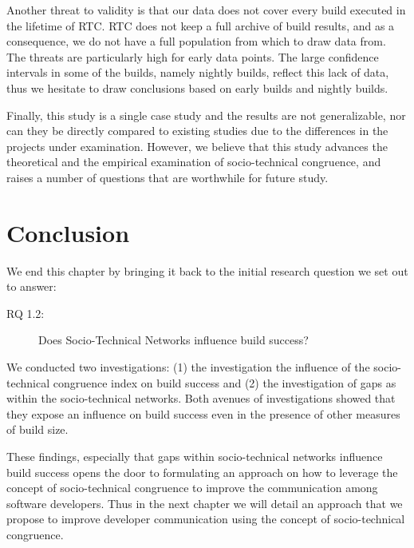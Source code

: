 Another threat to validity is that our data does not cover every build executed in the lifetime of RTC. RTC does not keep a full archive of build results, and as a consequence, we do not have a full population from which to draw data from. The threats are particularly high for early data points. The large confidence intervals in some of the builds, namely nightly builds, reflect this lack of data, thus we hesitate to draw conclusions based on early builds and nightly builds.

Finally, this study is a single case study and the results are not generalizable, nor can they be directly compared to existing studies due to the differences in the projects under examination. However, we believe that this study advances the theoretical and the empirical examination of socio-technical congruence, and raises a number of questions that are worthwhile for future study.


\section{Conclusion}
\label{sec:conclusion}
We end this chapter by bringing it back to the initial research question we set out to answer:
\begin{description}
  \item[RQ 1.2:] Does Socio-Technical Networks influence build success?
\end{description}

We conducted two investigations: (1) the investigation the influence of the socio-technical congruence index on build success and (2) the investigation of gaps as within the socio-technical networks.
Both avenues of investigations showed that they expose an influence on build success even in the presence of other measures of build size.

These findings, especially that gaps within socio-technical networks influence build success opens the door to formulating an approach on how to leverage the concept of socio-technical congruence to improve the communication among software developers.
Thus in the next chapter we will detail an approach that we propose to improve developer communication using the concept of socio-technical congruence.

